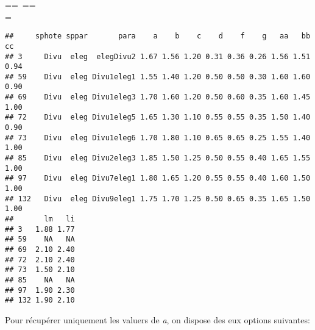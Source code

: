 \begin{knitrout}
\color{fgcolor}\begin{kframe}
\begin{flushleft}
\ttfamily\noindent
{}\hlassignement{\usebox{\hlnormalsizeboxlessthan}-}{\ }\hlkeyword{(}\hlkeyword{,}{\ }\hlkeyword{(}\hlkeyword{\usebox{\hlnormalsizeboxdollar}}=={\ }\hlkeyword{)}{\ }\hlkeyword{\usebox{\hlnormalsizeboxand}}{\ }\hlkeyword{(}\hlkeyword{\usebox{\hlnormalsizeboxdollar}}==\hspace*{\fill}\\
\hlstd{}{\ }{\ }{\ }{\ }\hlkeyword{)}{\ }\hlkeyword{\usebox{\hlnormalsizeboxand}}{\ }\hlkeyword{(}\hlkeyword{\usebox{\hlnormalsizeboxdollar}}\usebox{\hlnormalsizeboxlessthan}={\ }\hlkeyword{)}\hlkeyword{)}\hspace*{\fill}\\
\hlstd{}\mbox{}
\normalfont
\end{flushleft}
\begin{verbatim}
##     sphote sppar       para    a    b    c    d    f    g   aa   bb   cc
## 3     Divu  eleg  elegDivu2 1.67 1.56 1.20 0.31 0.36 0.26 1.56 1.51 0.94
## 59    Divu  eleg Divu1eleg1 1.55 1.40 1.20 0.50 0.50 0.30 1.60 1.60 0.90
## 69    Divu  eleg Divu1eleg3 1.70 1.60 1.20 0.50 0.60 0.35 1.60 1.45 1.00
## 72    Divu  eleg Divu1eleg5 1.65 1.30 1.10 0.55 0.55 0.35 1.50 1.40 0.90
## 73    Divu  eleg Divu1eleg6 1.70 1.80 1.10 0.65 0.65 0.25 1.55 1.40 1.00
## 85    Divu  eleg Divu2eleg3 1.85 1.50 1.25 0.50 0.55 0.40 1.65 1.55 1.00
## 97    Divu  eleg Divu7eleg1 1.80 1.65 1.20 0.55 0.55 0.40 1.60 1.50 1.00
## 132   Divu  eleg Divu9eleg1 1.75 1.70 1.25 0.50 0.65 0.35 1.65 1.50 1.00
##       lm   li
## 3   1.88 1.77
## 59    NA   NA
## 69  2.10 2.40
## 72  2.10 2.40
## 73  1.50 2.10
## 85    NA   NA
## 97  1.90 2.30
## 132 1.90 2.10
\end{verbatim}
\end{kframe}
\end{knitrout}


Pour récupérer uniquement les valuers de \emph{a}, on dispose des eux options suivantes:

